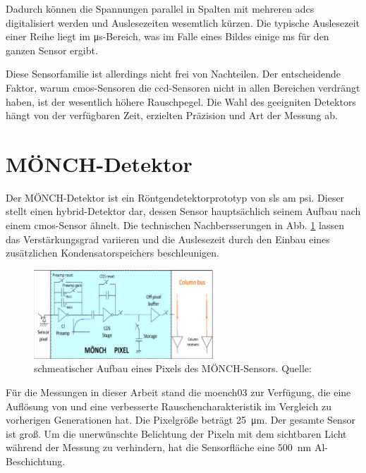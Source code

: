 \noindent
Dadurch können die Spannungen parallel in Spalten mit mehreren \gls{adc}s digitalisiert werden und Auslesezeiten wesemtlich kürzen. Die typische Auslesezeit einer Reihe liegt im \si{\micro\second}-Bereich, was im Falle eines  Bildes einige \si{\milli\second} für den ganzen Sensor ergibt.

\noindent
Diese Sensorfamilie ist allerdings nicht frei von Nachteilen. Der entscheidende Faktor, warum \gls{cmos}-Sensoren die \gls{ccd}-Sensoren nicht in allen Bereichen verdrängt haben, ist der wesentlich höhere Rauschpegel. Die Wahl des geeigniten Detektors hängt von der verfügbaren Zeit, erzielten Präzision und Art der Messung ab.

\section{MÖNCH-Detektor}
\label{text:moench_theorie}
Der MÖNCH-Detektor ist ein Röntgendetektorprototyp von \gls{sls} am \gls{psi}. Dieser stellt einen hybrid-Detektor dar, dessen Sensor hauptsächlich seinem Aufbau nach einem \gls{cmos}-Sensor ähnelt. Die technischen Nachbersserungen in Abb. \ref{fig:moench_pixel} lassen das Verstärkungsgrad variieren und die Auslesezeit durch den Einbau eines zusätzlichen Kondensatorspeichers beschleunigen.
\begin{figure}[H]
    \centering
    \includegraphics[width=0.6\textwidth]{images/moench/paper_crop.png}
    \caption{schmeatischer Aufbau eines Pixels des MÖNCH-Sensors. Quelle: \cite{dinapoli_monch_2014}}
    \label{fig:moench_pixel}
\end{figure}
\noindent
Für die Messungen in dieser Arbeit stand die \gls{moench03} zur Verfügung, die eine Auflösung von  und eine verbesserte Rauschencharakteristik im Vergleich zu vorherigen Generationen hat. Die Pixelgröße beträgt \SI{25}{\micro\meter}. Der gesamte Sensor ist  groß. Um die unerwünschte Belichtung der Pixeln mit dem sichtbaren Licht während der Messung zu verhindern, hat die Sensorfläche eine \SI{500}{\nano\meter} Al-Beschichtung.

